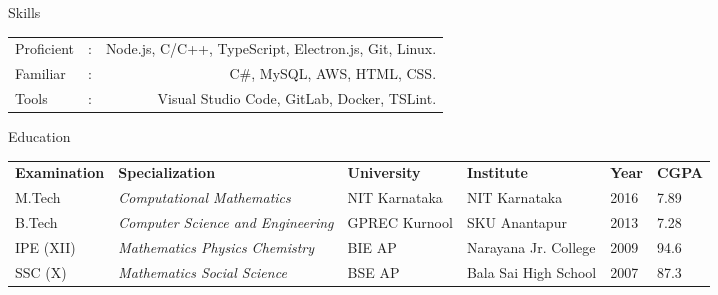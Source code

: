 \documentclass[]{mcdowellcv}
\begin{document}
	\makeheader
	
	\begin{cvsection}{Skills}
		\begin{cvsubsection}{}{}{}	
		    \begin{tabular}{ l c r }
                Proficient & : & Node.js, C/C++, TypeScript, Electron.js, Git, Linux. \\
                Familiar & : & C\#, MySQL, AWS, HTML, CSS. \\
                Tools & : & Visual Studio Code, GitLab, Docker, TSLint. \\
            \end{tabular}
		\end{cvsubsection}
	\end{cvsection}
	
	\begin{cvsection}{Education}
    \begin{cvsubsection}{}{}{}	
    	\indent \begin{tabular}{ l @{\hskip 0.15in} l @{\hskip 0.15in} l @{\hskip 0.15in} l @{\hskip 0.15in} l @{\hskip 0.15in} l }
        \textbf{Examination} & \textbf{Specialization} & \textbf{University} & \textbf{Institute} & \textbf{Year} & \textbf{CGPA} \\
        
        M.Tech & \textit{Computational Mathematics} & NIT Karnataka & NIT Karnataka & 2016 & 7.89 \\
        B.Tech & \textit{Computer Science and Engineering} & GPREC Kurnool & SKU Anantapur & 2013 & 7.28\\
        IPE (XII) & \textit{Mathematics Physics Chemistry} & BIE AP & Narayana Jr. College & 2009 & 94.6\\
        SSC (X) & \textit{Mathematics Social Science} & BSE AP & Bala Sai High School & 2007 & 87.3\\
        
    \end{tabular}
    \end{cvsubsection}
    \end{cvsection}
    
\end{document}
